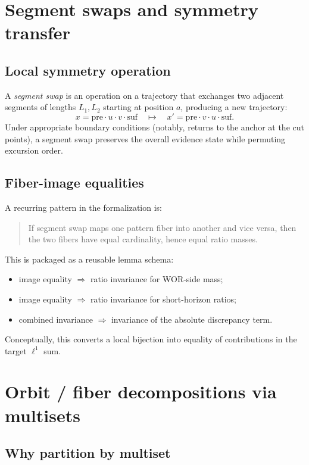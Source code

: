 \documentclass[11pt]{article}
\begin{document}
\section{Segment swaps and symmetry transfer}

\subsection{Local symmetry operation}

A \emph{segment swap} is an operation on a trajectory that exchanges two adjacent segments of
lengths $L_1,L_2$ starting at position $a$, producing a new trajectory:
\[
x = \mathrm{pre} \cdot u \cdot v \cdot \mathrm{suf}
\quad\mapsto\quad
x'=\mathrm{pre} \cdot v \cdot u \cdot \mathrm{suf}.
\]
Under appropriate boundary conditions (notably, returns to the anchor at the cut points),
a segment swap preserves the overall evidence state while permuting excursion order.

\subsection{Fiber-image equalities}

A recurring pattern in the formalization is:
\begin{quote}
If segment swap maps one pattern fiber into another and vice versa, then the two fibers have
equal cardinality, hence equal ratio masses.
\end{quote}
This is packaged as a reusable lemma schema:
\begin{itemize}
\item image equality $\Rightarrow$ ratio invariance for WOR-side mass;
\item image equality $\Rightarrow$ ratio invariance for short-horizon ratios;
\item combined invariance $\Rightarrow$ invariance of the absolute discrepancy term.
\end{itemize}

Conceptually, this converts a local bijection into equality of contributions in the target $\ell^1$
sum.

\section{Orbit / fiber decompositions via multisets}

\subsection{Why partition by multiset}
\end{document}
